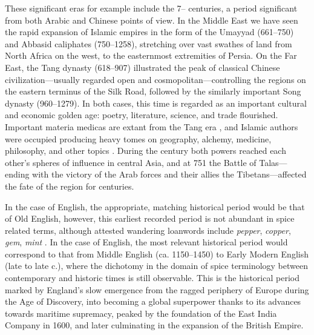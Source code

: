 These significant eras for example include the 7-- centuries, a period significant from both Arabic and Chinese points of view. In the Middle East we have seen the rapid expansion of Islamic empires in the form of the Umayyad (661--750) and Abbasid caliphates (750--1258), stretching over vast swathes of land from North Africa on the west, to the easternmost extremities of Persia. On the Far East, the Tang dynasty (618--907) illustrated the peak of classical Chinese civilization---usually regarded open and cosmopolitan---controlling the regions on the eastern terminus of the Silk Road, followed by the similarly important Song dynasty (960--1279). In both cases, this time is regarded as an important cultural and economic golden age: poetry, literature, science, and trade flourished. Important \glspl{materia medica} are extant from the Tang era \autocite{wu_illustrated_2005}, and Islamic authors were occupied producing heavy tomes on geography, alchemy, medicine, philosophy, and other topics \autocite[131]{meri_medieval_2006}. During the  century both powers reached each other's spheres of influence in central Asia, and at 751 the Battle of Talas---ending with the victory of the Arab forces and their allies the Tibetans---affected the fate of the region for centuries. 

In the case of English, the appropriate, matching historical period would be that of Old English, however, this earliest recorded period is not abundant in spice related terms, although attested wandering loanwords include \textit{pepper}, \textit{copper}, \textit{gem}, \textit{mint} \autocite{wollman_early_1993}. In the case of English, the most relevant historical period would correspond to that from Middle English (ca. 1150--1450) to Early Modern English (late  to late  c.), where the dichotomy in the domain of spice terminology between contemporary and historic times is still observable. This is the historical period marked by England's slow emergence from the ragged periphery of Europe during the Age of Discovery, into becoming a global superpower thanks to its advances towards maritime supremacy, peaked by the foundation of the East India Company in 1600, and later culminating in the expansion of the British Empire.




